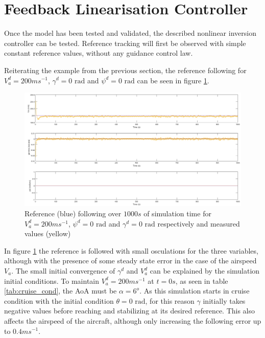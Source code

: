 \section{Feedback Linearisation Controller}
\label{section:results/fl_contro}

Once the model has been tested and validated, the described nonlinear inversion controller can be tested. Reference tracking will first be observed with simple constant reference values, without any guidance control law. 

Reiterating the example from the previous section, the reference following for $V_a^d=200 ms^{-1}$, $\gamma^d = 0\text{ rad}$ and $\psi^d = 0\text{ rad}$ can be seen in figure \ref{fig:const_ref}.
\begin{figure}[h]
\centering
\includegraphics[width=1.1\textwidth]{Figures/Results/nli_test_const.png}
\caption[Constant heading reference following of feedback linearisation controller]{Reference (blue) following over $1000s$ of simulation time for $V_a^d=200 ms^{-1}$, $\psi^d = 0\text{ rad}$ and $\gamma^d = 0\text{ rad}$ respectively and measured values (yellow)}
\label{fig:const_ref}
\end{figure}

In figure \ref{fig:const_ref} the reference is followed with small osculations for the three variables, although with the presence of some steady state error in the case of the airspeed $V_a$. The small initial convergence of $\gamma^d$ and $V_a^d$ can be explained by the simulation initial conditions. To maintain $V_a^d=200ms^{-1}$ at $t=0s$, as seen in table \ref{tab:cruise_cond}, the AoA must be $\alpha=6^o$. As this simulation starts in cruise condition with the initial condition $\theta=0 \text{ rad}$, for this reason $\gamma$ initially takes negative values before reaching and stabilizing at its desired reference. This also affects the airspeed of the aircraft, although only increasing the following error up to $0.4ms^{-1}$.


